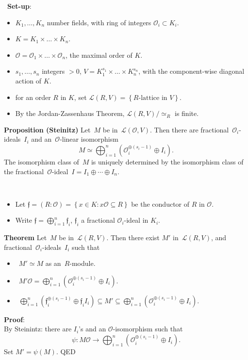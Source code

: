 \documentclass[aspectratio=169,handout,usenames,dvipsnames]{beamer}
\newcommand{\cO}{{\mathcal O}}
\newcommand{\cL}{{\mathcal L}}
\newcommand{\frf}{{\mathfrak f}}
\newcommand{\set}[1]{\left\lbrace#1\right\rbrace }
\begin{document}
\begin{frame}{}\
   {\bf Set-up}:
   \begin{itemize}
      \item $K_1,\ldots,K_n$ number fields, with ring of integers $\cO_i\subset K_i$.
      \item $K=K_1\times \ldots \times K_n$.
      \item $\cO=\cO_1\times \ldots \times \cO_n$, the maximal order of $K$.
      \pause
      \item $s_1,\ldots,s_n$ integers $>0$, $V = K_1^{s_1}\times \ldots\times K_n^{s_n}$, with the component-wise diagonal action of $K$.
      \item for an order $R$ in $K$, set $\cL(R,V) = \set{\text{$R$-lattice in $V$}}$.
      \item By the Jordan-Zassenhaus Theorem, $\cL(R,V)/\simeq_R$ is finite.
   \end{itemize}
   \pause
   \begin{block}{\bf Proposition (Steinitz)}
   Let~$M$ be in~$\cL(\cO,V)$.
   \pause
   Then there are fractional~$\cO_i$-ideals~$I_i$ and an~$\cO$-linear isomorphism
   \[ M\simeq
   \bigoplus_{i=1}^n \left(\cO_i^{\oplus(s_i-1)}\oplus I_i\right).
   \]
   \pause
   The isomorphism class of~$M$ is uniquely determined by 
   the isomorphism class of the fractional~$\cO$-ideal~$I=I_1\oplus \cdots \oplus I_n$.
   \end{block}
\end{frame}

\begin{frame}{}\
   \begin{itemize}
      \item Let $\frf=(R:\cO)=\set{ x \in K : x\cO \subseteq R}$ be the conductor of $R$ in $\cO$.
      \pause
      \item Write $\frf=\bigoplus_{i=1}^n\frf_i$, $\frf_i$ a fractional $\cO_i$-ideal in $K_i$.
   \end{itemize}
   \pause
   \begin{block}{\bf Theorem}
   Let~$M$ be in~$\cL(R,V)$.
   \pause
   Then there exist $M'$ in~$\cL(R,V)$, and fractional~$\cO_i$-ideals~$I_i$ such that
   \pause
   \begin{itemize}
      \item~$M'\simeq M$ as an~$R$-module.
      \pause
      \item~$M'\cO = \bigoplus_{i=1}^n \left(\cO_i^{\oplus(s_i-1)}\oplus I_i\right)$.
      \pause
      \item~$\bigoplus_{i=1}^n \left(\frf_i^{\oplus(s_i-1)}\oplus \frf_iI_i\right) \subseteq M' \subseteq
      \bigoplus_{i=1}^n \left(\cO_i^{\oplus(s_i-1)}\oplus I_i\right)$.
   \end{itemize}
   \end{block}
   \pause
   {\bf Proof}:\\
   By Steinintz: there are $I_i$'s and an $\cO$-isomorphism such that 
   \[ \psi: M\cO \to \bigoplus_{i=1}^n \left(\cO_i^{\oplus(s_i-1)}\oplus I_i\right). \]
   Set $M' = \psi(M)$.\quad
   QED
\end{frame}
\end{document}

